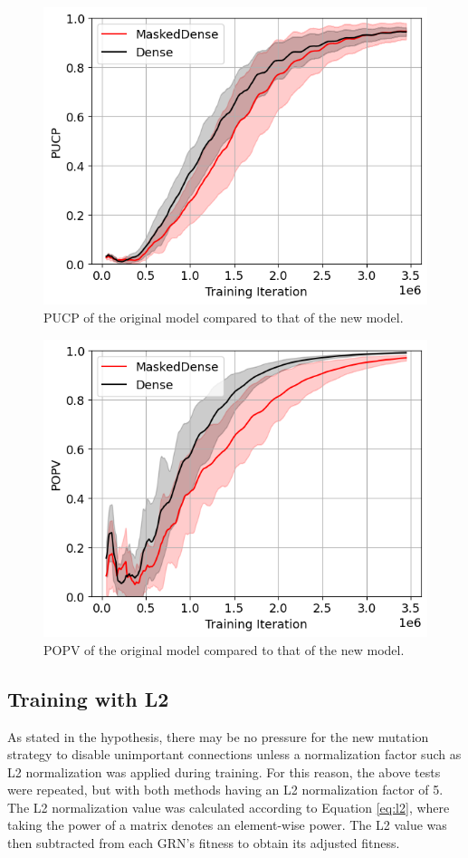 \documentclass[twocolumn,a4paper,11pt]{article}
\begin{document}
    \begin{figure}[h]
        \centering
        \includegraphics[width=0.8\linewidth]{ex-img/final-nol2-pucp.png}
        \caption{PUCP of the original model compared to that of the new model.} \label{fig:ex-A}
    \end{figure}

    \begin{figure}[h]
        \centering
        \includegraphics[width=0.8\linewidth]{ex-img/final-nol2-popv.png}
        \caption{POPV of the original model compared to that of the new model.} \label{fig:ex-A2}
    \end{figure}

    \subsection{Training with L2}

    As stated in the hypothesis, there may be no pressure for the new mutation strategy to disable unimportant connections unless a normalization factor such as L2 normalization was applied during training. For this reason, the above tests were repeated, but with both methods having an L2 normalization factor of 5. The L2 normalization value was calculated according to Equation \ref{eq:l2}, where taking the power of a matrix denotes an element-wise power. The L2 value was then subtracted from each GRN's fitness to obtain its adjusted fitness.
\end{document}
